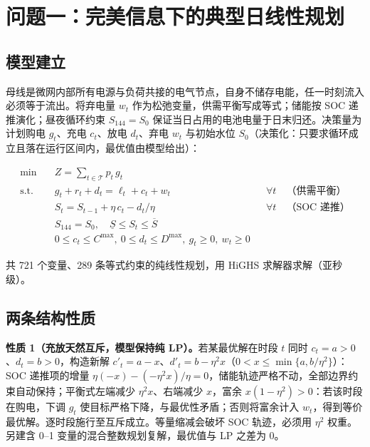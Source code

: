 \documentclass[12pt,a4paper]{ctexart}
\begin{document}
\section{问题一：完美信息下的典型日线性规划}\label{sec:q1}

\subsection{模型建立}

母线是微网内部所有电源与负荷共接的电气节点，自身不储存电能，任一时刻流入必须等于流出。将弃电量 $w_t$ 作为松弛变量，供需平衡写成等式；储能按 SOC 递推演化；昼夜循环约束 $S_{144}=S_0$ 保证当日占用的电池电量于日末归还。决策量为计划购电 $g_t$、充电 $c_t$、放电 $d_t$、弃电 $w_t$ 与初始水位 $S_0$（决策化：只要求循环成立且落在运行区间内，最优值由模型给出）：

\begin{equation}
\begin{aligned}
\min\quad & Z=\sum_{t\in\mathcal{T}} p_t\, g_t \\
\text{s.t.}\quad
& g_t+r_t+d_t=\ell_t+c_t+w_t && \forall t \quad\text{（供需平衡）}\\
& S_t=S_{t-1}+\eta\, c_t-d_t/\eta && \forall t \quad\text{（SOC 递推）}\\
& S_{144}=S_0,\quad \underline S\le S_t\le \overline S && \\
& 0\le c_t\le C^{\max},\ 0\le d_t\le D^{\max},\ g_t\ge0,\ w_t\ge0 &&
\end{aligned}
\label{eq:q1}
\end{equation}

共 721 个变量、289 条等式约束的纯线性规划，用 HiGHS 求解器\cite{huangfu2018}求解（亚秒级）。

\subsection{两条结构性质}

\textbf{性质 1（充放天然互斥，模型保持纯 LP）。}若某最优解在时段 $t$ 同时 $c_t=a>0$、$d_t=b>0$，构造新解 $c'_t=a-x$、$d'_t=b-\eta^2x$（$0<x\le\min\{a,b/\eta^2\}$）：SOC 递推项的增量 $\eta(-x)-(-\eta^2 x)/\eta=0$，储能轨迹严格不动，全部边界约束自动保持；平衡式左端减少 $\eta^2x$、右端减少 $x$，富余 $x(1-\eta^2)>0$：若该时段在购电，下调 $g_t$ 使目标严格下降，与最优性矛盾；否则将富余计入 $w_t$，得到等价最优解。逐时段施行至互斥成立。等量缩减会破坏 SOC 轨迹，必须用 $\eta^2$ 权重。另建含 0--1 变量的混合整数规划复解，最优值与 LP 之差为 0。
\end{document}
